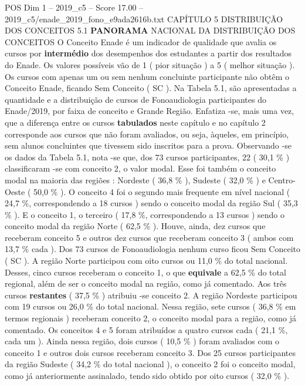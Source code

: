 \begin{textsample}{POS Dim 1 – 2019\_c5 – Score 17.00 – 2019\_c5/enade\_2019\_fono\_e9ada2616b.txt}  \label{ex:f1_pos_050}
CAPÍTULO 5 DISTRIBUIÇÃO DOS CONCEITOS 5.1 \textbf{PANORAMA} NACIONAL DA DISTRIBUIÇÃO DOS CONCEITOS O Conceito Enade é um indicador de qualidade que avalia os cursos por \textbf{intermédio} dos desempenhos dos estudantes a partir dos resultados do Enade.
Os valores possíveis vão de 1 ( pior situação ) a 5 ( melhor situação ).
Os cursos com apenas um ou sem nenhum concluinte participante não obtêm o Conceito Enade, ficando Sem Conceito ( SC ).
Na Tabela 5.1, são apresentadas a quantidade e a distribuição de cursos de Fonoaudiologia participantes do Enade/2019, por faixa de conceito e Grande Região.
Enfatiza -se, mais uma vez, que a diferença entre os cursos \textbf{tabulados} neste capítulo e no capítulo 2 corresponde aos cursos que não foram avaliados, ou seja, àqueles, em princípio, sem alunos concluintes que tivessem sido inscritos para a prova.
Observando -se os dados da Tabela 5.1, nota -se que, dos 73 cursos participantes, 22 ( 30,1 \% ) classificaram -se com conceito 2, o valor modal.
Esse foi também o conceito modal na maioria das regiões : Nordeste ( 36,8 \% ), Sudeste ( 32,0 \% ) e Centro-Oeste ( 50,0 \% ).
O conceito 4 foi o segundo mais frequente em nível nacional ( 24,7 \%, correspondendo a 18 cursos ) sendo o conceito modal da região Sul ( 35,3 \% ).
E o conceito 1, o terceiro ( 17,8 \%, correspondendo a 13 cursos ) sendo o conceito modal da região Norte ( 62,5 \% ).
Houve, ainda, dez cursos que receberam conceito 5 e outros dez cursos que receberam conceito 3 ( ambos com 13,7 \% cada ).
Dos 73 cursos de Fonoaudiologia nenhum curso ficou Sem Conceito ( SC ).
A região Norte participou com oito cursos ou 11,0 \% do total nacional.
Desses, cinco cursos receberam o conceito 1, o que \textbf{equivale} a 62,5 \% do total regional, além de ser o conceito modal na região, como já comentado.
Aos três cursos \textbf{restantes} ( 37,5 \% ) atribuiu -se conceito 2.
A região Nordeste participou com 19 cursos ou 26,0 \% do total nacional.
Nessa região, sete cursos ( 36,8 \% em termos regionais ) receberam conceito 2, o conceito modal para a região, como já comentado.
Os conceitos 4 e 5 foram atribuídos a quatro cursos cada ( 21,1 \%, cada um ).
Ainda nessa região, dois cursos ( 10,5 \% ) foram avaliados com o conceito 1 e outros dois cursos receberam conceito 3.
Dos 25 cursos participantes da região Sudeste ( 34,2 \% do total nacional ), o conceito 2 foi o conceito modal, como já anteriormente assinalado, tendo sido obtido por oito cursos ( 32,0 \% ).

\end{textsample}
